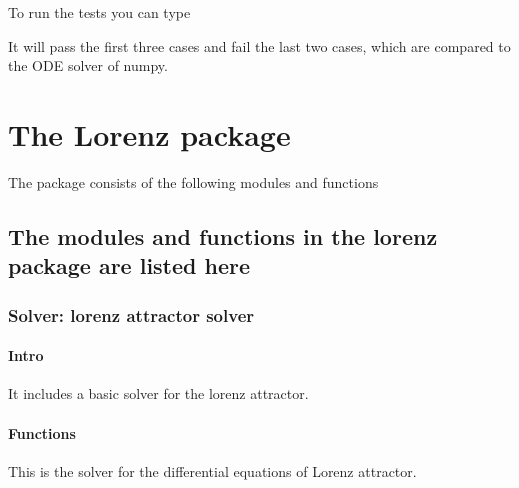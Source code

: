 \documentclass[letterpaper,10pt,english]{sphinxmanual}
\begin{document}
To run the tests you can type

\begin{sphinxVerbatim}[commandchars=\\\{\}]
 
\end{sphinxVerbatim}

It will pass the first three cases and fail the last two cases, which are compared to the ODE solver of numpy.


\chapter{The Lorenz package}
\label{\detokenize{index:the-lorenz-package}}
The package consists of the following modules and functions


\section{The modules and functions in the lorenz package are listed here}
\label{\detokenize{Functions:the-modules-and-functions-in-the-lorenz-package-are-listed-here}}\label{\detokenize{Functions::doc}}

\subsection{Solver: lorenz attractor solver}
\label{\detokenize{Functions:solver-lorenz-attractor-solver}}

\subsubsection{Intro}
\label{\detokenize{Functions:intro}}
It includes a basic solver for the lorenz attractor.


\subsubsection{Functions}
\label{\detokenize{Functions:module-lorenz.solver}}\label{\detokenize{Functions:functions}}
This is the solver for the differential equations of Lorenz attractor.
\end{document}
